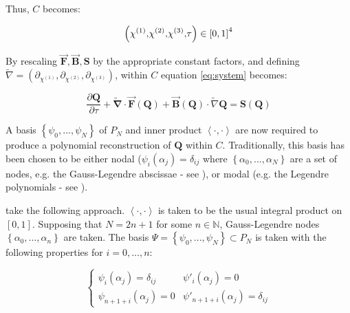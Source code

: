 \documentclass[twoside,english,final,5p,times,twocolumn]{elsarticle}
\begin{document}
Thus, $C$ becomes:

\begin{equation}
\left(\text{\ensuremath{\chi^{\left(1\right)}},\ensuremath{\chi^{\left(2\right)}},\ensuremath{\chi^{\left(3\right)}},\ensuremath{\tau}}\right)\in\left[0,1\right]^{4}
\end{equation}

By rescaling $\overrightarrow{\boldsymbol{F}},\overrightarrow{\boldsymbol{B}},\boldsymbol{S}$
by the appropriate constant factors, and defining $\tilde{\nabla}=\left(\partial_{\chi^{\left(1\right)}},\partial_{\chi^{\left(2\right)}},\partial_{\chi^{\left(3\right)}}\right)$,
within $C$ equation \eqref{eq:system} becomes:

\begin{equation}
\frac{\partial\boldsymbol{Q}}{\partial\tau}+\tilde{\boldsymbol{\nabla}}\cdot\overrightarrow{\boldsymbol{F}}\left(\boldsymbol{Q}\right)+\overrightarrow{\boldsymbol{B}}\left(\boldsymbol{Q}\right)\cdot\tilde{\nabla}\boldsymbol{Q}=\boldsymbol{S}\left(\boldsymbol{Q}\right)\label{eq:system rescaled}
\end{equation}

A basis $\left\{ \psi_{0},...,\psi_{N}\right\} $ of $P_{N}$ and
inner product $\left\langle \cdot,\cdot\right\rangle $ are now required
to produce a polynomial reconstruction of $\boldsymbol{Q}$ within
$C$. Traditionally, this basis has been chosen to be either nodal
($\psi_{i}\left(\alpha_{j}\right)=\delta_{ij}$ where $\left\{ \alpha_{0},\ldots,\alpha_{N}\right\} $
are a set of nodes, e.g. the Gauss-Legendre abscissae - see \citet{Dumbser2008}),
or modal (e.g. the Legendre polynomials - see \citet{Balsara2009}).

\citet{Montecinos2017} take the following approach. $\left\langle \cdot,\cdot\right\rangle $
is taken to be the usual integral product on $\left[0,1\right]$.
Supposing that $N=2n+1$ for some $n\in\mathbb{N}$, Gauss-Legendre
nodes $\left\{ \alpha_{0},\ldots,\alpha_{n}\right\} $ are taken.
The basis $\Psi=\left\{ \psi_{0},...,\psi_{N}\right\} \subset P_{N}$
is taken with the following properties for $i=0,\ldots,n$:

\begin{equation}
\begin{cases}
\psi_{i}\left(\alpha_{j}\right)=\delta_{ij} & \psi'_{i}\left(\alpha_{j}\right)=0\\
\psi_{n+1+i}\left(\alpha_{j}\right)=0 & \psi'_{n+1+i}\left(\alpha_{j}\right)=\delta_{ij}
\end{cases}
\end{equation}
\end{document}
